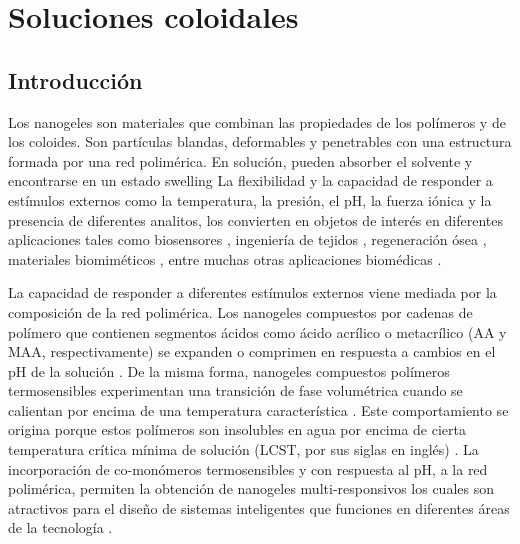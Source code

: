 \chapter{Soluciones coloidales} \label{cap:mc:soluciones}
	
	\section{Introducci\'on}
	
	Los nanogeles son materiales que combinan las propiedades de los pol\'imeros y de los coloides. Son part\'iculas blandas, deformables y penetrables con una estructura formada por una red polim\'erica. \cite{lyon2012polymer} En soluci\'on, pueden absorber el solvente y encontrarse en un estado swelling \cite{karg2019nanogels,perez2021thermodynamic}
	La flexibilidad y la capacidad de responder a est\'imulos externos como la temperatura, la presi\'on, el pH, la fuerza i\'onica y la presencia de diferentes analitos, los convierten en objetos de inter\'es en diferentes aplicaciones tales como biosensores \cite{zhang2012ultrathin,islam2014responsive}, ingenier\'ia de tejidos \cite{matricardi2013interpenetrating,van2011biopolymer}, regeneraci\'on \'osea \cite{bai2018bioactive}, materiales biomim\'eticos \cite{green2016mimicking,wu2010multifunctional}, entre muchas otras aplicaciones biom\'edicas \cite{Daly2020}. 
	
	La capacidad de responder a diferentes est\'imulos externos viene mediada por la composici\'on de la red polim\'erica.
	Los nanogeles compuestos por cadenas de pol\'imero que contienen segmentos \'acidos como \'acido acr\'ilico o metacr\'ilico (AA y MAA, respectivamente) se expanden o comprimen  en respuesta a cambios en el pH de la soluci\'on \cite{snowden1996colloidal,Zhou1998}.
	De la misma forma, nanogeles compuestos pol\'imeros termosensibles experimentan una transici\'on de fase volum\'etrica cuando se calientan por encima de una temperatura caracter\'istica \cite{Pelton1986,Pelton2000}.
	Este comportamiento se origina porque estos pol\'imeros son insolubles en agua por encima de cierta temperatura cr\'itica m\'inima  de soluci\'on (LCST, por sus siglas en ingl\'es) \cite{Kawaguchi2020}.
	La incorporaci\'on de co-mon\'omeros termosensibles y con respuesta al pH, a la red polim\'erica,  permiten la obtenci\'on de nanogeles multi-responsivos los cuales son atractivos para el dise\~no de sistemas inteligentes que funciones en diferentes \'areas de la tecnolog\'ia \cite{plamper2017functional}.	
	
